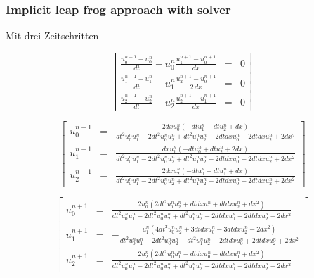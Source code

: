 \documentclass[border=10pt]{article}
\begin{document}
\subsubsection*{Implicit leap frog approach with solver}


Mit drei Zeitschritten

\begin{equation}
 \left|  \begin{array}{lcl}
   \frac{u^{n+1}_0 - u^{n}_0}{dt} + u^{n}_0  \frac{u^{n+1}_1 - u^{n+1}_0}{dx} & = & 0 \\[6pt]
   \frac{u^{n+1}_1 - u^{n}_1}{dt} + u^{n}_1  \frac{u^{n+1}_2 - u^{n+1}_0}{2\, dx}  & = & 0 \\[6pt]
   \frac{u^{n+1}_2 - u^{n}_2}{dt} + u^{n}_2  \frac{u^{n+1}_2 - u^{n+1}_1}{dx}  & = & 0  \end{array} \right|
\end{equation}

\begin{equation}
  \left[  \begin{array}{lcl}
  u^{n+1}_0 & = & \frac{2 dx u^{n}_{0} \left(- dt u^{n}_{1} + dt u^{n}_{2} + dx\right)}{dt^{2} u^{n}_{0} u^{n}_{1} - 2 dt^{2} u^{n}_{0} u^{n}_{2} + dt^{2} u^{n}_{1} u^{n}_{2} - 2 dt dx u^{n}_{0} + 2 dt dx u^{n}_{2} + 2 dx^{2}}\\[9pt]

  u^{n+1}_1 & = & \frac{dx u^{n}_{1} \left(- dt u^{n}_{0} + dt u^{n}_{2} + 2 dx\right)}{dt^{2} u^{n}_{0} u^{n}_{1} - 2 dt^{2} u^{n}_{0} u^{n}_{2} + dt^{2} u^{n}_{1} u^{n}_{2} - 2 dt dx u^{n}_{0} + 2 dt dx u^{n}_{2} + 2 dx^{2}} \\[9pt]

  u^{n+1}_2 & = & \frac{2 dx u^{n}_{2} \left(- dt u^{n}_{0} + dt u^{n}_{1} + dx\right)}{dt^{2} u^{n}_{0} u^{n}_{1} - 2 dt^{2} u^{n}_{0} u^{n}_{2} + dt^{2} u^{n}_{1} u^{n}_{2} - 2 dt dx u^{n}_{0} + 2 dt dx u^{n}_{2} + 2 dx^{2}}
   \end{array} \right]
\end{equation}

\begin{equation}
  \left[  \begin{array}{lcl}
  u^{n+1}_0 & = & \frac{2 u^{n}_0 \left(2 dt^{2} u^{n}_1 u^{n}_2 + dt dx u^{n}_1 + dt dx u^{n}_2 + dx^{2}\right)}{dt^{2} u^{n}_0 u^{n}_1 - 2 dt^{2} u^{n}_0 u^{n}_2 + dt^{2} u^{n}_1 u^{n}_2 - 2 dt dx u^{n}_0 + 2 dt dx u^{n}_2 + 2 dx^{2}}\\[9pt]
  u^{n+1}_1 & = &
- \frac{u^{n}_1 \left(4 dt^{2} u^{n}_0 u^{n}_2 + 3 dt dx u^{n}_0 - 3 dt dx u^{n}_2 - 2 dx^{2}\right)}{dt^{2} u^{n}_0 u^{n}_1 - 2 dt^{2} u^{n}_0 u^{n}_2 + dt^{2} u^{n}_1 u^{n}_2 - 2 dt dx u^{n}_0 + 2 dt dx u^{n}_2 + 2 dx^{2}}\\[9pt]
  u^{n+1}_2 & = &
\frac{2 u^{n}_2 \left(2 dt^{2} u^{n}_0 u^{n}_1 - dt dx u^{n}_0 - dt dx u^{n}_1 + dx^{2}\right)}{dt^{2} u^{n}_0 u^{n}_1 - 2 dt^{2} u^{n}_0 u^{n}_2 + dt^{2} u^{n}_1 u^{n}_2 - 2 dt dx u^{n}_0 + 2 dt dx u^{n}_2 + 2 dx^{2}}
  \end{array} \right]
\end{equation}
\end{document}
